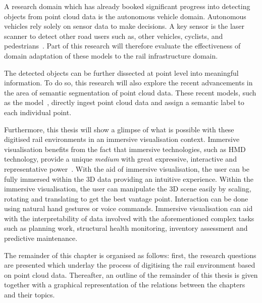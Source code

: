 A research domain which has already booked significant progress into detecting objects from point cloud data is the autonomous vehicle domain. Autonomous vehicles rely solely on sensor data to make decisions. A key sensor is the laser scanner to detect other road users such as, other vehicles, cyclists, and pedestrians~\cite{Kuutti18}. Part of this research will therefore evaluate the effectiveness of domain adaptation of these models to the rail infrastructure domain.

The detected objects can be further dissected at point level into meaningful information. To do so, this research will also explore the recent advancements in the area of semantic segmentation of point cloud data. These recent models, such as the \pnpp{} model~\cite{Qi.17.2}, directly ingest point cloud data and assign a semantic label to each individual point.

Furthermore, this thesis will show a glimpse of what is possible with these digitised rail environments in an immersive visualisation context. Immersive visualisation benefits from the fact that immersive technologies, such as HMD technology, provide a unique \emph{medium} with great expressive, interactive and representative power~\cite{Rubio17}. With the aid of immersive visualisation, the user can be fully immersed within the 3D data providing an intuitive experience. Within the immersive visualisation, the user can manipulate the 3D scene easily by scaling, rotating and translating to get the best vantage point. Interaction can be done using natural hand gestures or voice commands. Immersive visualisation can aid with the interpretability of data involved with the aforementioned complex tasks such as planning work, structural health monitoring, inventory assessment and predictive maintenance.


The remainder of this chapter is organised as follows: first, the research questions are presented which underlay the process of digitising the rail environment based on point cloud data. Thereafter, an outline of the remainder of this thesis is given together with a graphical representation of the relations between the chapters and their topics.


